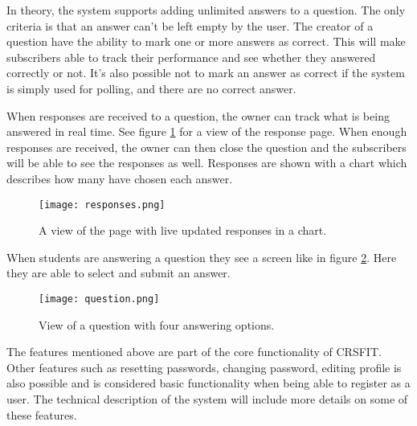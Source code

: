 In theory, the system supports adding unlimited answers to a question. The only criteria is that an answer can't be left empty by the user. The creator of a question have the ability to mark one or more answers as correct. This will make subscribers able to track their performance and see whether they answered correctly or not. It's also possible not to mark an answer as correct if the system is simply used for polling, and there are no correct answer.

When responses are received to a question, the owner can track what is being answered in real time. See figure \ref{fig:responses} for a view of the response page. When enough responses are received, the owner can then close the question and the subscribers will be able to see the responses as well. Responses are shown with a chart which describes how many have chosen each answer.

\begin{figure}[H]
\capstart
	\centering
		\texttt{[image: responses.png]}
	\caption[The response page]{A view of the page with live updated responses in a chart.}\label{fig:responses}
\end{figure}

When students are answering a question they see a screen like in figure \ref{fig:question}. Here they are able to select and submit an answer.

\begin{figure}[H]
\capstart
	\centering
		\texttt{[image: question.png]}
	\caption[A question page]{View of a question with four answering options.}\label{fig:question}
\end{figure}

The features mentioned above are part of the core functionality of CRSFIT. Other features such as resetting passwords, changing password, editing profile is also possible and is considered basic functionality when being able to register as a user.
The technical description of the system will include more details on some of these features.

